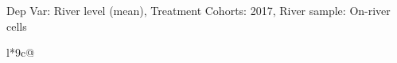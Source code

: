 \begin{table}[H]
\captionlistentry[table]{}
\label{table:beaver_hydrometry_DVlevel_mean_SCg2}
\tiny %
Dep Var: River level (mean), Treatment Cohorts: 2017, River sample: On-river cells \\
\begin{threeparttable}
\begin{tabulary}{\textwidth}{l*{9}{c}@{}}
\toprule \toprule
\noalign{\smallskip}
\noalign{\smallskip}
\midrule \bottomrule
\end{tabulary}
\medskip
\end{threeparttable}
\end{table}
